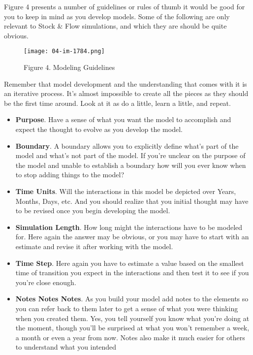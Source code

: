 \documentclass[]{memoir}
\let\Oldincludegraphics\includegraphics
\renewcommand{\includegraphics}[1]{\Oldincludegraphics[max size={\textwidth}{\textheight}]{#1}}
\begin{document}
Figure 4 presents a number of guidelines or rules of thumb it would be
good for you to keep in mind as you develop models. Some of the
following are only relevant to Stock \& Flow simulations, and which they
are should be quite obvious.

\begin{figure}[htbp]
\centering
\texttt{[image: 04-im-1784.png]}
\caption{Figure 4. Modeling Guidelines}
\end{figure}

Remember that model development and the understanding that comes with it
is an iterative process. It's almost impossible to create all the pieces
as they should be the first time around. Look at it as do a little,
learn a little, and repeat.

\begin{itemize}
\itemsep1pt\parskip0pt
\item
  \textbf{Purpose}. Have a sense of what you want the model to
  accomplish and expect the thought to evolve as you develop the model.
\item
  \textbf{Boundary}. A boundary allows you to explicitly define what's
  part of the model and what's not part of the model. If you're unclear
  on the purpose of the model and unable to establish a boundary how
  will you ever know when to stop adding things to the model?
\item
  \textbf{Time Units}. Will the interactions in this model be depicted
  over Years, Months, Days, etc. And you should realize that you initial
  thought may have to be revised once you begin developing the model.
\item
  \textbf{Simulation Length}. How long might the interactions have to be
  modeled for. Here again the answer may be obvious, or you may have to
  start with an estimate and revise it after working with the model.
\item
  \textbf{Time Step}. Here again you have to estimate a value based on
  the smallest time of transition you expect in the interactions and
  then test it to see if you you're close enough.
\item
  \textbf{Notes Notes Notes}. As you build your model add notes to the
  elements so you can refer back to them later to get a sense of what
  you were thinking when you created them. Yes, you tell yourself you
  know what you're doing at the moment, though you'll be surprised at
  what you won't remember a week, a month or even a year from now. Notes
  also make it much easier for others to understand what you intended

\end{itemize}
\end{document}
